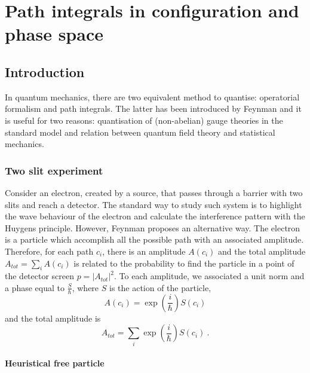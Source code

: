 \part{Path integrals in configuration and phase space}

\chapter{Introduction}

    In quantum mechanics, there are two equivalent method to quantise: operatorial formalism and path integrals. The latter has been introduced by Feynman and it is useful for two reasons: quantisation of (non-abelian) gauge theories in the standard model and relation between quantum field theory and statistical mechanics.

\section{Two slit experiment}

    Consider an electron, created by a source, that passes through a barrier with two slits and reach a detector. The standard way to study such system is to highlight the wave behaviour of the electron and calculate the interference pattern with the Huygens principle. However, Feynman proposes an alternative way. The electron is a particle which accomplish all the possible path with an associated amplitude. Therefore, for each path $c_i$, there is an amplitude $A (c_i)$ and the total amplitude $A_{tot} = \sum_i A(c_i)$ is related to the probability to find the particle in a point of the detector screen $p = |A_{tot}|^2$. To each amplitude, we associated a unit norm and a phase equal to $\frac{S}{\hbar}$, where $S$ is the action of the particle, 
    \begin{equation*}
        A(c_i) = \exp( \frac{i}{\hbar}) S(c_i)
    \end{equation*}
    and the total amplitude is 
    \begin{equation*}
        A_{tot} = \sum_i \exp( \frac{i}{\hbar}) S(c_i) ~.
    \end{equation*}

\subsection{Heuristical free particle} 


